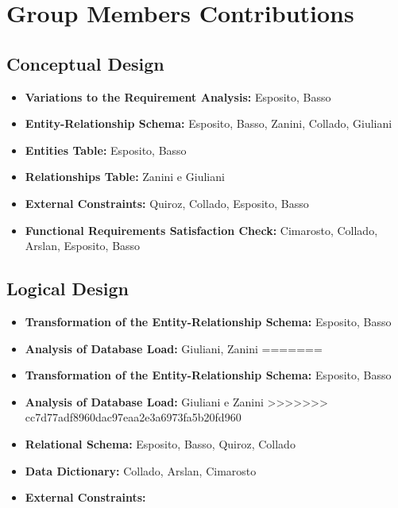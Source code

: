 \section{Group Members Contributions}


\subsection{Conceptual Design}
\begin{itemize}
	\item \textbf{Variations to the Requirement Analysis:} Esposito, Basso
	\item \textbf{Entity-Relationship Schema:} Esposito, Basso, Zanini, Collado, Giuliani 
	\item \textbf{Entities Table:} Esposito, Basso
	\item \textbf{Relationships Table:} Zanini e Giuliani
	\item \textbf{External Constraints:} Quiroz, Collado, Esposito, Basso
	\item \textbf{Functional Requirements Satisfaction Check:} Cimarosto, Collado, Arslan, Esposito, Basso
\end{itemize}

\subsection{Logical Design}
\begin{itemize}
<<<<<<< HEAD
	\item \textbf{Transformation of the Entity-Relationship Schema:} Esposito, Basso 
	\item \textbf{Analysis of Database Load:} Giuliani, Zanini
=======
	\item \textbf{Transformation of the Entity-Relationship Schema:} Esposito, Basso
	\item \textbf{Analysis of Database Load:} Giuliani e Zanini
>>>>>>> cc7d77adf8960dac97eaa2e3a6973fa5b20fd960
	\item \textbf{Relational Schema:} Esposito, Basso, Quiroz, Collado
	\item \textbf{Data Dictionary:} Collado, Arslan, Cimarosto
	\item \textbf{External Constraints:}
\end{itemize}	
